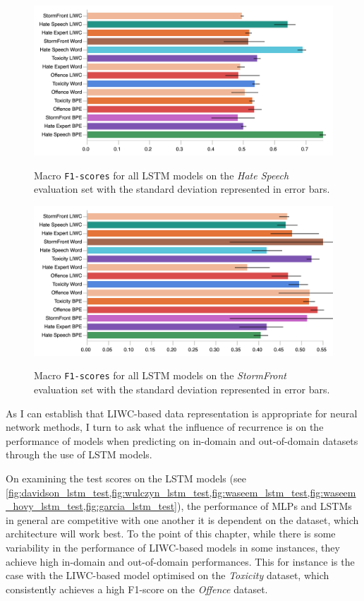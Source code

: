 \begin{figure}
\begin{minipage}{\textwidth}
    \centering
    \includegraphics[width=\textwidth]{all_lstm_waseem_hovy_test.pdf}
    \caption{Macro \texttt{F1-scores} for all LSTM models on the \textit{Hate Speech} evaluation set with the standard deviation represented in error bars.}
  \label{fig:waseem_hovy_lstm_test}  
  \vfill
    \includegraphics[width=\textwidth]{all_lstm_garcia_test.pdf}
  \caption{Macro \texttt{F1-scores} for all LSTM models on the \textit{StormFront} evaluation set with the standard deviation represented in error bars.}
  \label{fig:garcia_lstm_test}
\end{minipage}
\end{figure}

As I can establish that LIWC-based data representation is appropriate for  neural network methods, I turn to ask what the influence of recurrence is on the performance of models when predicting on in-domain and out-of-domain datasets through the use of LSTM models.

On examining the test scores on the LSTM models (see \cref{fig:davidson_lstm_test,fig:wulczyn_lstm_test,fig:waseem_lstm_test,fig:waseem_hovy_lstm_test,fig:garcia_lstm_test}),  the performance of MLPs and LSTMs in general are competitive with one another  it is dependent on the dataset, which  architecture will work best.
To the point of this chapter, while there is some variability in the performance of LIWC-based models in some instances, they achieve high in-domain and out-of-domain performances.
This for instance is the case with the LIWC-based model optimised on the \textit{Toxicity} dataset, which consistently achieves a high F1-score on the \textit{Offence} dataset.

